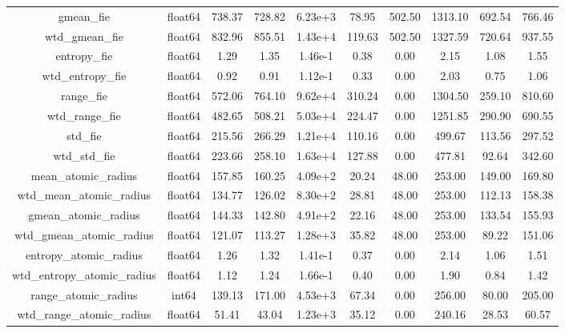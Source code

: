 \documentclass[11pt]{article}
\begin{document}
\begin{table}[H]
{\begin{tabular}{|c|c|c|c|c|c|c|c|c|c|}
gmean\_fie                        & float64&   738.37&   728.82&  6.23e+3&    78.95&  502.50&   1313.10&   692.54&   766.46 \\
wtd\_gmean\_fie                    & float64&   832.96&   855.51&  1.43e+4&   119.63&  502.50&   1327.59&   720.64&   937.55 \\
entropy\_fie                      & float64&     1.29&     1.35&  1.46e-1&     0.38&    0.00&      2.15&     1.08&     1.55 \\
wtd\_entropy\_fie                  & float64&     0.92&     0.91&  1.12e-1&     0.33&    0.00&      2.03&     0.75&     1.06 \\
range\_fie                        & float64&   572.06&   764.10&  9.62e+4&   310.24&    0.00&   1304.50&   259.10&   810.60 \\
wtd\_range\_fie                    & float64&   482.65&   508.21&  5.03e+4&   224.47&    0.00&   1251.85&   290.90&   690.55 \\
std\_fie                          & float64&   215.56&   266.29&  1.21e+4&   110.16&    0.00&    499.67&   113.56&   297.52 \\
wtd\_std\_fie                      & float64&   223.66&   258.10&  1.63e+4&   127.88&    0.00&    477.81&    92.64&   342.60 \\
mean\_atomic\_radius               & float64&   157.85&   160.25&  4.09e+2&    20.24&   48.00&    253.00&   149.00&   169.80 \\
wtd\_mean\_atomic\_radius           & float64&   134.77&   126.02&  8.30e+2&    28.81&   48.00&    253.00&   112.13&   158.38 \\
gmean\_atomic\_radius              & float64&   144.33&   142.80&  4.91e+2&    22.16&   48.00&    253.00&   133.54&   155.93 \\
wtd\_gmean\_atomic\_radius          & float64&   121.07&   113.27&  1.28e+3&    35.82&   48.00&    253.00&    89.22&   151.06 \\
entropy\_atomic\_radius            & float64&     1.26&     1.32&  1.41e-1&     0.37&    0.00&      2.14&     1.06&     1.51 \\
wtd\_entropy\_atomic\_radius        & float64&     1.12&     1.24&  1.66e-1&     0.40&    0.00&      1.90&     0.84&     1.42 \\
range\_atomic\_radius              &   int64&   139.13&   171.00&  4.53e+3&    67.34&    0.00&    256.00&    80.00&   205.00 \\
wtd\_range\_atomic\_radius          & float64&    51.41&    43.04&  1.23e+3&    35.12&    0.00&    240.16&    28.53&    60.57 \\

\end{tabular}}
\end{table}
\end{document}

